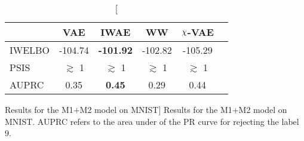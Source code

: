 \begin{table}
    \centering
    \begin{small}
\begin{tabular}{lccccc}
\toprule
 & \textbf{VAE} & \textbf{IWAE}& \textbf{WW} & \textbf{$\rchi$-VAE} \\ 
 \midrule
IWELBO  & -104.74 & \textbf{-101.92} & -102.82 & -105.29\\
PSIS & $\gtrsim$ 1 & $\gtrsim$ 1 & $\gtrsim$ 1 & $\gtrsim$ 1\\
AUPRC & 0.35 & \textbf{0.45} & 0.29 & 0.44 \\
\bottomrule
\end{tabular}
\end{small}
\caption
[Results for the M1+M2 model on MNIST]{\label{table:m1m2}
Results for the M1+M2 model on MNIST. AUPRC refers to the area under of the PR curve for rejecting the label 9. 
}
\end{table}
